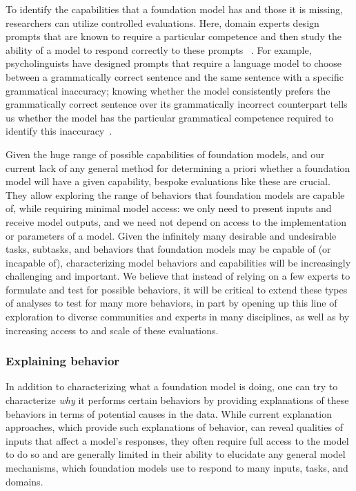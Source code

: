 To identify the capabilities that a foundation model has and those it is missing, researchers can utilize controlled  evaluations. Here, domain experts design prompts that are known to require a particular competence and then study the ability of a model to respond correctly to these prompts ~\citep{papadimitriou2020learning,DBLP:journals/corr/abs-2103-05247,kataoka2020pre,wu2021identifying,xie2021innout,koh2021wilds}. For example, psycholinguists have designed prompts that require a language model to choose between a grammatically correct sentence and the same sentence with a specific  grammatical inaccuracy; knowing whether the model consistently prefers the grammatically correct sentence over its grammatically incorrect counterpart tells us whether the model has the particular grammatical competence required to identify this inaccuracy~\citep{linzen2016assessing}.

Given the huge range of possible capabilities of foundation models, and our current lack of any general method for determining a priori whether a foundation model will have a given capability, bespoke evaluations like these are crucial. They allow exploring the range of behaviors that foundation models are capable of, while requiring minimal model access: we only need to present inputs and receive model outputs, and we need not depend on access to the implementation or parameters of a model. Given the infinitely many desirable and undesirable tasks, subtasks, and behaviors that foundation models may be capable of (or incapable of), characterizing model behaviors and capabilities will be increasingly challenging and important. We believe that instead of relying on a few experts to formulate and test for possible behaviors, it will be critical to extend these types of analyses to test for many more behaviors, in part by opening up this line of exploration to diverse communities and experts in many disciplines, as well as by increasing access to and scale of these evaluations.

\subsubsection{Explaining behavior}

In addition to characterizing what a foundation model is doing, one can try to characterize \textit{why} it performs certain behaviors by providing explanations of these behaviors in terms of potential causes in the data. While current explanation approaches, which provide such explanations of behavior, can reveal qualities of inputs that affect a model's responses, they often require full access to the model to do so and are generally limited in their ability to elucidate any general model mechanisms, which foundation models use to respond to many inputs, tasks, and domains.

